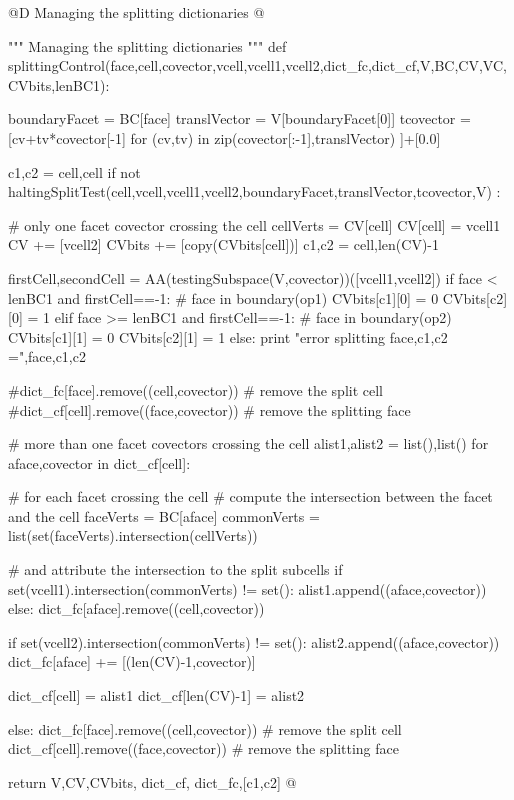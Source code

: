 \documentclass[11pt,oneside]{article}	%
\begin{document}
@D Managing the splitting dictionaries
@{""" Managing the splitting dictionaries """
def splittingControl(face,cell,covector,vcell,vcell1,vcell2,dict_fc,dict_cf,V,BC,CV,VC,CVbits,lenBC1):

	boundaryFacet = BC[face]
	translVector = V[boundaryFacet[0]]
	tcovector = [cv+tv*covector[-1] for (cv,tv) in zip(covector[:-1],translVector) ]+[0.0]

	c1,c2 = cell,cell
	if not haltingSplitTest(cell,vcell,vcell1,vcell2,boundaryFacet,translVector,tcovector,V) :

		# only one facet covector crossing the cell
		cellVerts = CV[cell]
		CV[cell] = vcell1
		CV += [vcell2]
		CVbits += [copy(CVbits[cell])]
		c1,c2 = cell,len(CV)-1
	
		firstCell,secondCell = AA(testingSubspace(V,covector))([vcell1,vcell2])
		if face < lenBC1 and firstCell==-1:  		# face in boundary(op1)
			CVbits[c1][0] = 0
			CVbits[c2][0] = 1
		elif face >= lenBC1 and firstCell==-1:  	# face in boundary(op2)
			CVbits[c1][1] = 0 
			CVbits[c2][1] = 1
		else: print "error splitting face,c1,c2 =",face,c1,c2
	
		#dict_fc[face].remove((cell,covector))	# remove the split cell
		#dict_cf[cell].remove((face,covector))	# remove the splitting face
				
		# more than one facet covectors crossing the cell
		alist1,alist2 = list(),list()
		for aface,covector in dict_cf[cell]:
		
			# for each facet crossing the cell
			# compute the intersection between the facet and the cell
			faceVerts = BC[aface]
			commonVerts = list(set(faceVerts).intersection(cellVerts))
			
			# and attribute the intersection to the split subcells
			if set(vcell1).intersection(commonVerts) != set():
				alist1.append((aface,covector))
			else: dict_fc[aface].remove((cell,covector)) 
					
			if set(vcell2).intersection(commonVerts) != set():
				alist2.append((aface,covector))
				dict_fc[aface] += [(len(CV)-1,covector)]
		
		dict_cf[cell] = alist1  
		dict_cf[len(CV)-1] = alist2
		
	else:
		dict_fc[face].remove((cell,covector))	# remove the split cell
		dict_cf[cell].remove((face,covector))	# remove the splitting face	
		
	return V,CV,CVbits, dict_cf, dict_fc,[c1,c2]
@}
\end{document}
